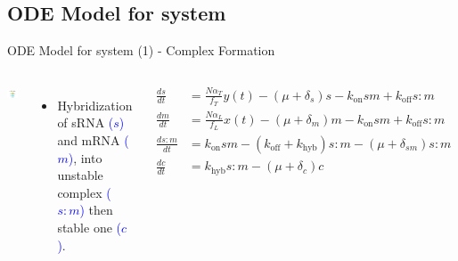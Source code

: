 \documentclass{beamer}
\begin{document}
\subsection{ODE Model for system}
\begin{frame}{ODE Model for system (1) - Complex Formation}{}
\begin{columns}
\includegraphics[trim = 135 0 0 0,clip = true,scale = 0.31]{Figures/schematic_binding}
  \begin{itemize}
    \item  Hybridization of sRNA \textcolor{blue}{($s$)} and mRNA \textcolor{blue}{($m$)}, into unstable complex \textcolor{blue}{($s:m$)} then stable one \textcolor{blue}{($c$)}.
    \end{itemize}
\footnotesize
\begin{align*} 
\frac{ds}{dt} &= \frac{N\alpha_{T}}{f_{T}} y(t)-(\mu + \delta_{s})s -k_{\mathrm{on}}sm +k_{\mathrm{off}}s:m \\
\frac{dm}{dt} &=  \frac{N\alpha_{L}}{f_{L}}x(t)-(\mu + \delta_{m})m -k_{\mathrm{on}}sm +k_{\mathrm{off}}s:m  \\
\frac{ds:m}{dt} & = k_{\mathrm{on}}sm  - (k_{\mathrm{off}}+ k_{\mathrm{hyb}})s:m  -(\mu + \delta_{sm} )s:m \\
\frac{dc}{dt} & = k_{\mathrm{hyb}}s:m  -(\mu + \delta_{c})c  \\
\end{align*}
\end{columns}
\end{frame}
\end{document}
